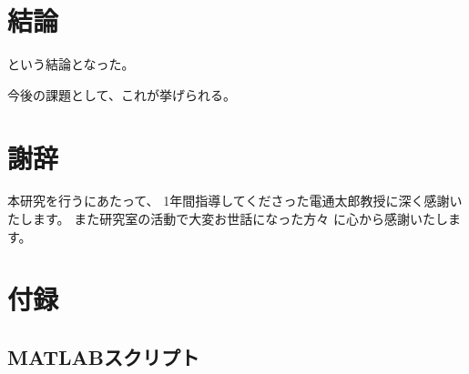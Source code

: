 \documentclass[a4paper, book, twoside, openany, fontsize = 11pt, gutter = 3cm]{jlreq}
\begin{document}
		\chapter{結論} \label{chap:conclusion}
			という結論となった。

			今後の課題として、これが挙げられる。

	\backmatter
		\nocite{bib-example} %

		\printbibliography[title=参考文献] %
		\chapter{謝辞}
			本研究を行うにあたって、
			1年間指導してくださった電通太郎教授に深く感謝いたします。
			また研究室の活動で大変お世話になった方々
			に心から感謝いたします。

		\appendix
		\chapter{付録}
			\section{MATLABスクリプト} \label{sec:matlabscript}
				
\end{document}
